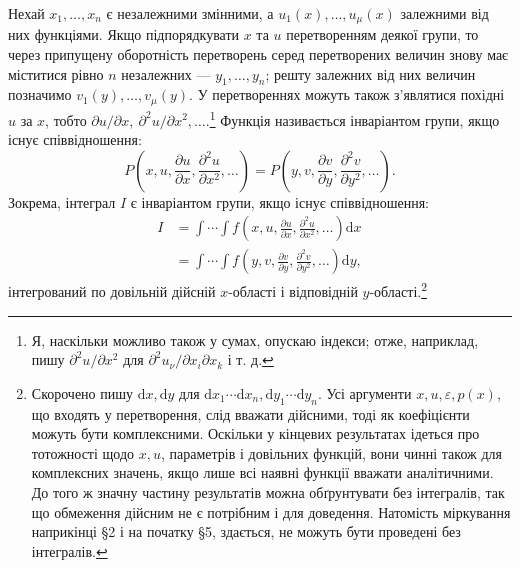 \documentclass[11pt]{article}
\providecommand{\eps}{\varepsilon}
\providecommand{\p}{\partial}
\providecommand{\dd}{\mathrm d}
\begin{document}
Нехай \(x_1,\ldots,x_n\) є незалежними змінними, а \(u_1(x),\ldots,u_\mu(x)\) залежними від них функціями. Якщо підпорядкувати \(x\) та \(u\) перетворенням деякої групи, то через припущену оборотність перетворень серед перетворених величин знову має міститися рівно \(n\) незалежних --- \(y_1,\ldots,y_n\); решту залежних від них величин позначимо \(v_1(y),\ldots,v_\mu(y)\). У перетвореннях можуть також з'являтися похідні \(u\) за \(x\), тобто \(\p u/\p x,\ \p^2u/\p x^2,\ldots\).\footnote{Я, наскільки можливо також у сумах, опускаю індекси; отже, наприклад, пишу \(\p^2u/\p x^2\) для \(\p^2u_\nu/\p x_i\p x_k\) і т. д.} Функція називається інваріантом групи, якщо існує співвідношення:
\[
P\!\left(x,u,\frac{\p u}{\p x},\frac{\p^2u}{\p x^2},\ldots\right)
 =
P\!\left(y,v,\frac{\p v}{\p y},\frac{\p^2v}{\p y^2},\ldots\right).
\]
Зокрема, інтеграл \(I\) є інваріантом групи, якщо існує співвідношення:
\begin{equation}
\begin{aligned}
I&=\int\!\cdots\!\int f\!\left(x,u,\frac{\p u}{\p x},\frac{\p^2u}{\p x^2},\ldots\right)\dd x\\
 &=\int\!\cdots\!\int f\!\left(y,v,\frac{\p v}{\p y},\frac{\p^2v}{\p y^2},\ldots\right)\dd y,
\end{aligned}
\tag{1}
\end{equation}
інтегрований по довільній дійсній \(x\)-області і відповідній \(y\)-області.\footnote{Скорочено пишу \(\dd x,\dd y\) для \(\dd x_1\cdots \dd x_n,\dd y_1\cdots \dd y_n\). Усі аргументи \(x,u,\eps,p(x)\), що входять у перетворення, слід вважати дійсними, тоді як коефіцієнти можуть бути комплексними. Оскільки у кінцевих результатах ідеться про тотожності щодо \(x,u\), параметрів і довільних функцій, вони чинні також для комплексних значень, якщо лише всі наявні функції вважати аналітичними. До того ж значну частину результатів можна обґрунтувати без інтегралів, так що обмеження дійсним не є потрібним і для доведення. Натомість міркування наприкінці \S{}2 і на початку \S{}5, здається, не можуть бути проведені без інтегралів.}
\end{document}
